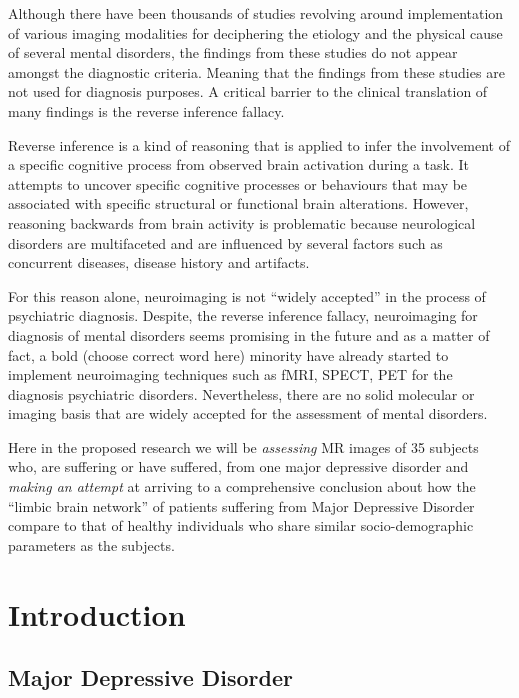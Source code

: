 \documentclass{article}
\begin{document}
  Although there have been thousands of studies revolving around
  implementation of various imaging modalities for deciphering the
  etiology and the physical cause of several mental disorders, the
  findings from these studies do not appear amongst the diagnostic
  criteria. Meaning that the findings from these studies are not used
  for diagnosis purposes. A critical barrier to the clinical
  translation of many findings is the reverse inference fallacy.

  Reverse inference is a kind of reasoning that is applied to infer
  the involvement of a specific cognitive process from observed brain
  activation during a task.  It attempts to uncover specific cognitive
  processes or behaviours that may be associated with specific
  structural or functional brain alterations. However, reasoning
  backwards from brain activity is problematic because neurological
  disorders are multifaceted and are influenced by several factors
  such as concurrent diseases, disease history and artifacts.

  For this reason alone, neuroimaging is not ``widely accepted'' in
  the process of psychiatric diagnosis.  Despite, the reverse
  inference fallacy, neuroimaging for diagnosis of mental disorders
  seems promising in the future and as a matter of fact, a bold
  (choose correct word here) minority have already started to
  implement neuroimaging techniques such as fMRI, SPECT, PET for the
  diagnosis psychiatric disorders. Nevertheless, there are no solid
  molecular or imaging basis that are widely accepted for the
  assessment of mental disorders.

  Here in the proposed research we will be \textit{assessing} MR
  images of 35 subjects who, are suffering or have suffered, from one
  major depressive disorder and \textit{making an attempt} at arriving
  to a comprehensive conclusion about how the ``limbic brain network''
  of patients suffering from Major Depressive Disorder compare to that
  of healthy individuals who share similar socio-demographic
  parameters as the subjects.

\newpage

\clearpage
\setcounter{page}{1}

\section{Introduction}

\subsection{Major Depressive Disorder}
\end{document}
